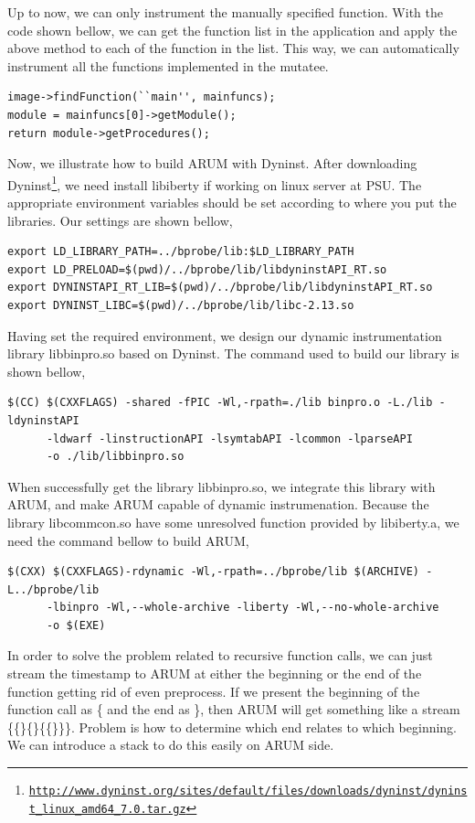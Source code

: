 \documentclass[11pt,letterpaper,oneside]{article}
\begin{document}
Up to now, we can only instrument the manually specified function. With the code shown bellow, we can get the function list in the application and apply the above method to each of the function in the list. This way, we can automatically instrument all the functions implemented in the mutatee.
\begin{Verbatim}[frame=single]
image->findFunction(``main'', mainfuncs);
module = mainfuncs[0]->getModule();
return module->getProcedures();
\end{Verbatim}

Now, we illustrate how to build ARUM with Dyninst. After downloading Dyninst\footnote{\texttt{\url{http://www.dyninst.org/sites/default/files/downloads/dyninst/dyninst_linux_amd64_7.0.tar.gz}}}, we need install libiberty if working on linux server at PSU. The appropriate environment variables should be set according to where you put the libraries. Our settings are shown bellow,

\begin{Verbatim}[frame=single]
export LD_LIBRARY_PATH=../bprobe/lib:$LD_LIBRARY_PATH
export LD_PRELOAD=$(pwd)/../bprobe/lib/libdyninstAPI_RT.so
export DYNINSTAPI_RT_LIB=$(pwd)/../bprobe/lib/libdyninstAPI_RT.so
export DYNINST_LIBC=$(pwd)/../bprobe/lib/libc-2.13.so
\end{Verbatim}

Having set the required environment, we design our dynamic instrumentation library libbinpro.so based on Dyninst. The command used to build our library is shown bellow,

\begin{Verbatim}[frame=single]
$(CC) $(CXXFLAGS) -shared -fPIC -Wl,-rpath=./lib binpro.o -L./lib -ldyninstAPI
      -ldwarf -linstructionAPI -lsymtabAPI -lcommon -lparseAPI
      -o ./lib/libbinpro.so
\end{Verbatim}

When successfully get the library libbinpro.so, we integrate this library with ARUM, and make ARUM capable of dynamic instrumenation. Because the library libcommcon.so have some unresolved function provided by libiberty.a, we need the command bellow to build ARUM,

\begin{Verbatim}[frame=single]
$(CXX) $(CXXFLAGS)-rdynamic -Wl,-rpath=../bprobe/lib $(ARCHIVE) -L../bprobe/lib
      -lbinpro -Wl,--whole-archive -liberty -Wl,--no-whole-archive
      -o $(EXE)
\end{Verbatim}

In order to solve the problem related to recursive function calls, we can just stream the timestamp to ARUM at either the beginning or the end of the function getting rid of even preprocess. If we present the beginning of the function call as \{ and the end as \}, then ARUM will get something like a stream \{\{\}\{\}\{\{\}\}\}. Problem is how to determine which end relates to which beginning. We can introduce a stack to do this easily on ARUM side.
\end{document}
